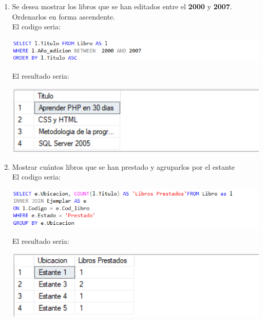 \documentclass{article}
\begin{document}
\begin{enumerate}[\tab 1.]
\begin{center}
        \end{center}
        \item Se desea mostrar los libros que se han editados entre el \textbf{2000} y \textbf{2007}. Ordenarlos en forma ascendente.\\[0.1in]
        El codigo seria:
        \begin{center}
            \includegraphics[width=13cm]{./images/11.1.png}
        \end{center}
        El resultado seria:
        \begin{center}
            \includegraphics[width=13cm]{./images/11.2.png}
        \end{center}
        \item Mostrar cuántos libros que se han prestado y agruparlos por el estante\\[0.1in]
        El codigo seria:
        \begin{center}
            \includegraphics[width=13cm]{./images/12.1.png}
        \end{center}
        \newpage
        El resultado seria:
        \begin{center}
            \includegraphics[width=13cm]{./images/12.2.png}
        \end{center}
    \end{enumerate}
    
\end{document}
